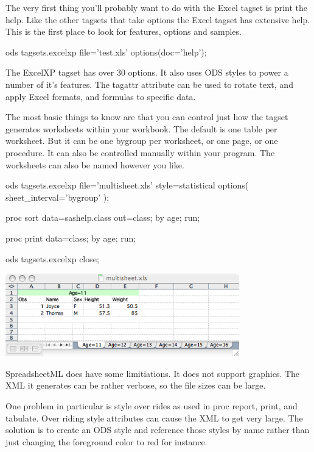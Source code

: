 The very first thing you'll probably want to do with the Excel tagset is
print the help.  Like the other tagsets that take options the Excel tagset
has extensive help.  This is the first place to look for features, options 
and samples.

\begin{sfvcode}
ods tagsets.excelxp file='test.xls' options(doc='help');
\end{sfvcode}


The ExcelXP tagset has over 30 options.  It also uses ODS styles to power
a number of it's features.   The tagattr attribute can be used to rotate
text, and apply Excel formats, and formulas to specific data.

The most basic things to know are that you can control just how the tagset
generates worksheets within your workbook.  The default is one table per worksheet.
But it can be one bygroup per worksheet, or one page, or one procedure.  It can
also be controlled manually within your program.  The worksheets can also be named
however you like.

\begin{sfvcode}

  ods tagsets.excelxp file='multisheet.xls' style=statistical
                      options( sheet_interval='bygroup' );

  proc sort data=sashelp.class out=class;
     by age;
  run;

  proc print data=class;
     by age;
  run;

  ods tagsets.excelxp close;
\end{sfvcode}

\includegraphics[width=4in]{excelby.png}

SpreadsheetML does have some limitiations.  It does not support graphics.   
The XML it generates can be rather verbose, so the file sizes can be large.

One problem in particular is style over rides as used in proc report, print,
and tabulate.  Over riding style attributes can cause the XML to get very large.
The solution is to create an ODS style and reference those styles by name rather
than just changing the foreground color to red for instance.

